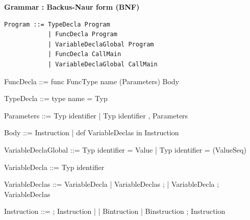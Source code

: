\documentclass[11pt]{report}
\begin{document}
\newpage
\centerline{\textbf{\Huge Grammar : Backus-Naur form (BNF)}}
\vspace*{20 pt}
\vspace*{3pt}
\begin{Verbatim}[fontfamily=textsf]
Program ::= TypeDecla Program
            | FuncDecla Program
            | VariableDeclaGlobal Program
            | FuncDecla CallMain
            | VariableDeclaGlobal CallMain
\end{Verbatim}
\vspace*{3pt}

\begin{verbnobox}[\normalfont]
FuncDecla ::= func FuncType name (Parameters) Body
\end{verbnobox}
\vspace*{3pt}

\begin{verbnobox}[\normalfont]
TypeDecla ::= type name = Typ
\end{verbnobox}
\vspace*{3pt}

\begin{verbnobox}[\normalfont]
Parameters ::= Typ identifier | Typ identifier , Parameters
\end{verbnobox}
\vspace*{3pt}

\begin{verbnobox}[\normalfont]
Body ::= { Instruction } | { def VariableDeclas in Instruction }
\end{verbnobox}
\vspace*{3pt}

\begin{verbnobox}[\normalfont]
VariableDeclaGlobal ::= Typ identifier = Value | Typ identifier = (ValueSeq)
\end{verbnobox}
\vspace*{3pt}

\begin{verbnobox}[\normalfont]
VariableDecla ::= Typ identifier
\end{verbnobox}
\vspace*{3pt}

\begin{verbnobox}[\normalfont]
VariableDeclas ::= VariableDecla 
                    | VariableDeclas ; 
                    | VariableDecla ; VariableDeclas
\end{verbnobox}
\vspace*{3pt}

\begin{verbnobox}[\normalfont]
Instruction ::= ; Instruction
               |
               | Bintruction 
               | Binstruction ; Instruction
\end{verbnobox}
\vspace*{3pt}
\end{document}

